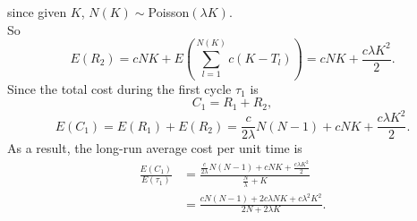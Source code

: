\documentclass{extarticle}
\theoremstyle{plain}
\theoremstyle{definition}
\begin{document}
since given $K$, $N(K)\sim$Poisson$(\lambda K)$.\\
So
\[E(R_2) = cNK + E\left( \sum_{l=1}^{N(K)}c(K-T_l) \right) = cNK + \frac{c\lambda K^2}{2}.\]
Since the total cost during the first cycle $\tau_1$ is 
\[C_1 = R_1 + R_2,\]
\[E(C_1) = E(R_1) + E(R_2) = \frac{c}{2\lambda}N(N-1) + cNK + \frac{c\lambda K^2}{2}.\]
As a result, the long-run average cost per unit time is 
\begin{align*}
	\frac{E(C_1)}{E(\tau_1)} &= \frac{\frac{c}{2\lambda}N(N-1) + cNK + \frac{c\lambda K^2}{2}}{\frac{N}{\lambda}  + K}\\
  							 &= \frac{cN(N-1) + 2c\lambda NK + c\lambda^2 K^2}{2N + 2\lambda K}.
\end{align*}
\end{document}
